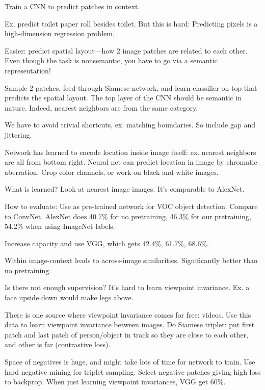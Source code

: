 Train a CNN to predict patches in context. 

Ex. predict toilet paper roll besides toilet. But this is hard:
Predicting pixels is a high-dimension regression problem.

Easier: predict spatial layout---how 2 image patches are related to each other. Even though the task is nonsemantic, you have to go via a semantic representation!

Sample 2 patches, feed through Siamese network, and learn classifier on top that predicts the spatial layout. The top layer of the CNN should be semantic in nature.  
Indeed, nearest neighbors are from the same category.

We have to avoid trivial shortcuts, ex. matching boundaries. So include gap and jittering.

Network has learned to encode location inside image itself: ex. nearest neighbors are all from bottom right. Neural net can predict location in image by chromatic aberration. 
Crop color channels, or work on black and white images.

What is learned? Look at nearest image images. It's comparable to AlexNet.

How to evaluate: Use as pre-trained network for VOC object detection. Compare to ConvNet.
AlexNet does 40.7\% for no pretraining, 46.3\% for our pretraining, 54.2\% when using ImageNet labels.

Increase capacity and use VGG, which gets 42.4\%, 61.7\%, 68.6\%.

Within image-context leads to across-image similarities. Significantly better than no pretraining.

Is there not enough supervision? It's hard to learn viewpoint invariance. Ex. a face upside down would make legs above.

There is one source where viewpoint invariance comes for free: videos. Use this data to learn viewpoint invariance between images. Do Siamese triplet: put first patch and last patch of person/object in track so they are close to each other, and other is far (contrastive loss).


Space of negatives is huge, and might take lots of time for network to train. Use hard negative mining for triplet sampling. Select negative patches giving high loss to backprop.
When just learning viewpoint invariances, VGG get 60\%.%

